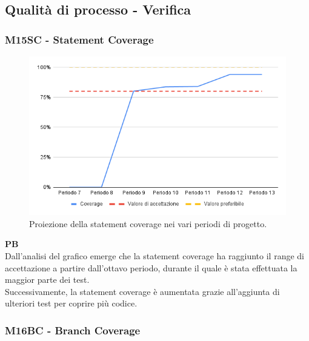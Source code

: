 \subsection{Qualità di processo - Verifica}

\vspace{0.3cm}

\subsubsection{M15SC - Statement Coverage}

\vspace{0.3cm}

\begin{figure}[H]
    \centering
    \includegraphics[width=1\textwidth]{../Images/PianoDiQualifica/M15SC.png}
    \caption{Proiezione della statement coverage nei vari periodi di progetto.}
    \label{fig:13}
\end{figure}

\vspace{0.2cm}

\textbf{PB} \\
Dall’analisi del grafico emerge che la statement coverage ha raggiunto il range di accettazione a partire dall'ottavo periodo, durante il quale è stata effettuata la maggior parte dei test. \\
Successivamente, la statement coverage è aumentata grazie all’aggiunta di ulteriori test per coprire più codice.

\vspace{0.2cm}

\subsubsection{M16BC - Branch Coverage}

